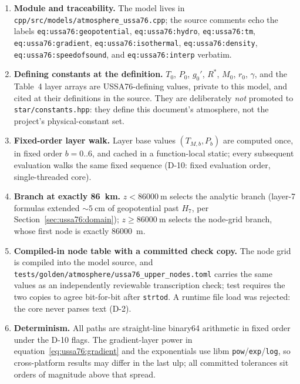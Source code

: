 \begin{enumerate}
  \item \textbf{Module and traceability.} The model lives in
    \texttt{cpp/src/models/atmosphere\_ussa76.cpp}; the source comments
    echo the labels \texttt{eq:ussa76:geopotential},
    \texttt{eq:ussa76:hydro}, \texttt{eq:ussa76:tm},
    \texttt{eq:ussa76:gradient}, \texttt{eq:ussa76:isothermal},
    \texttt{eq:ussa76:density}, \texttt{eq:ussa76:speedofsound}, and
    \texttt{eq:ussa76:interp} verbatim.
  \item \textbf{Defining constants at the definition.} $T_0$, $P_0$,
    $g_0'$, $R^{*}$, $M_0$, $r_0$, $\gamma$, and the Table~4 layer arrays
    are USSA76-defining values, private to this model, and cited at their
    definitions in the source. They are deliberately \emph{not} promoted
    to \texttt{star/constants.hpp}: they define this document's
    atmosphere, not the project's physical-constant set.
  \item \textbf{Fixed-order layer walk.} Layer base values $(T_{M,b},
    P_b)$ are computed once, in fixed order $b = 0..6$, and cached in a
    function-local static; every subsequent evaluation walks the same
    fixed sequence (D-10: fixed evaluation order, single-threaded core).
  \item \textbf{Branch at exactly \qty{86}{\kilo\metre}.} $z <
    \qty{86000}{\metre}$ selects the analytic branch (layer-7 formulas
    extended $\sim\qty{5}{\centi\metre}$ of geopotential past $H_7$, per
    Section~\ref{sec:ussa76:domain}); $z \ge \qty{86000}{\metre}$ selects
    the node-grid branch, whose first node is exactly
    \qty{86000}{\metre}.
  \item \textbf{Compiled-in node table with a committed check copy.} The
    node grid is compiled into the model source, and
    \texttt{tests/golden/atmosphere/ussa76\_upper\_nodes.toml} carries the
    same values as an independently reviewable transcription check; test
     requires the two copies to agree
    bit-for-bit after \texttt{strtod}. A runtime file load was rejected:
    the core never parses text (D-2).
  \item \textbf{Determinism.} All paths are straight-line binary64
    arithmetic in fixed order under the D-10 flags. The gradient-layer
    power in equation~\eqref{eq:ussa76:gradient} and the exponentials use
    libm \texttt{pow}/\texttt{exp}/\texttt{log}, so cross-platform
    results may differ in the last ulp; all committed tolerances sit
    orders of magnitude above that spread.
\end{enumerate}

